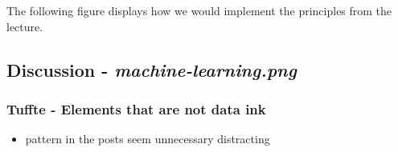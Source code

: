 \documentclass[a4paper]{article}
\begin{document}
    The following figure displays how we would implement the principles from the lecture.
    


    \subsection{Discussion - \textit{machine-learning.png}}

    \subsubsection{Tuffte - Elements that are not \textbf{data ink}}
    \begin{itemize}
        \item pattern in the posts seem unnecessary distracting
    \end{itemize}
\end{document}

